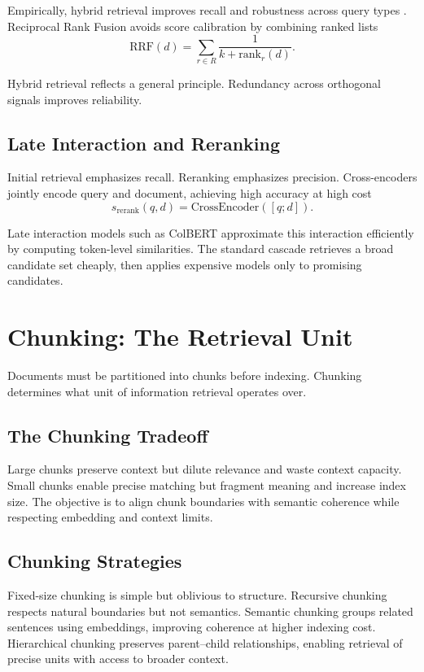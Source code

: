 Empirically, hybrid retrieval improves recall and robustness across query types \cite{hybridrag2025}. Reciprocal Rank Fusion avoids score calibration by combining ranked lists
\[
\text{RRF}(d) = \sum_{r \in R} \frac{1}{k + \text{rank}_r(d)}.
\]

Hybrid retrieval reflects a general principle. Redundancy across orthogonal signals improves reliability.

\subsection{Late Interaction and Reranking}

Initial retrieval emphasizes recall. Reranking emphasizes precision. Cross-encoders jointly encode query and document, achieving high accuracy at high cost
\[
s_{\text{rerank}}(q,d) = \text{CrossEncoder}([q; d]).
\]

Late interaction models such as ColBERT \cite{colbert} approximate this interaction efficiently by computing token-level similarities. The standard cascade retrieves a broad candidate set cheaply, then applies expensive models only to promising candidates.

\section{Chunking: The Retrieval Unit}

Documents must be partitioned into chunks before indexing. Chunking determines what unit of information retrieval operates over.

\subsection{The Chunking Tradeoff}

Large chunks preserve context but dilute relevance and waste context capacity. Small chunks enable precise matching but fragment meaning and increase index size. The objective is to align chunk boundaries with semantic coherence while respecting embedding and context limits.

\subsection{Chunking Strategies}

Fixed-size chunking is simple but oblivious to structure. Recursive chunking respects natural boundaries but not semantics. Semantic chunking groups related sentences using embeddings, improving coherence at higher indexing cost. Hierarchical chunking preserves parent–child relationships, enabling retrieval of precise units with access to broader context.

